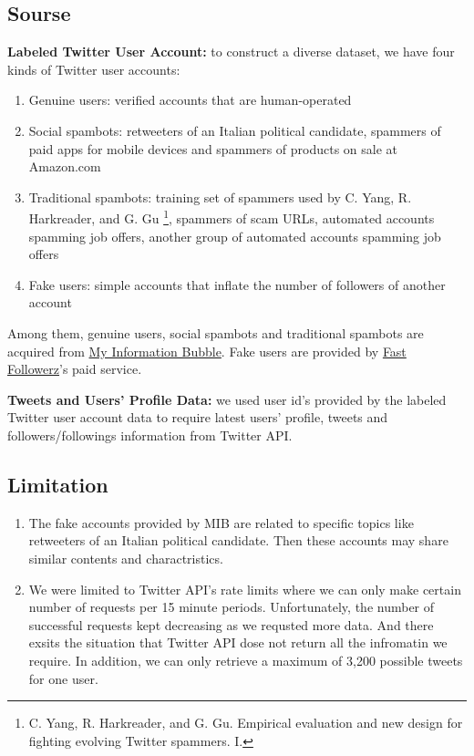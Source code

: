 \documentclass[a4paper, 12pt]{report}
\begin{document}
\subsection*{Sourse}
\textbf{Labeled Twitter User Account:} to construct a diverse dataset, we have four kinds of Twitter user accounts:
\begin{enumerate}
	\item Genuine users: verified accounts that are human-operated
	\item Social spambots: retweeters of an Italian political candidate, spammers of paid apps for mobile devices and spammers of products on sale at Amazon.com
	\item Traditional spambots: training set of spammers used by C. Yang, R. Harkreader, and G. Gu \footnote{C. Yang, R. Harkreader, and G. Gu. Empirical evaluation and new design for fighting evolving Twitter spammers. I.}, spammers of scam URLs, automated accounts spamming job offers, another group of automated accounts spamming job offers	
	\item Fake users: simple accounts that inflate the number of followers of another account
\end{enumerate}
Among them, genuine users, social spambots and traditional spambots are acquired from \href{http://mib.projects.iit.cnr.it/dataset.html}{My Information Bubble}. Fake users are provided by \href{https://www.fastfollowerz.com/closed/}{Fast Followerz}'s paid service. \par

\noindent\textbf{Tweets and Users' Profile Data:} we used user id's provided by the labeled Twitter user account data to require latest users' profile, tweets and followers/followings information from Twitter API.

\subsection*{Limitation}
\begin{enumerate}
	\item The fake accounts provided by MIB are related to specific topics like retweeters of an Italian political candidate. Then these accounts may share similar contents and charactristics.
	\item We were limited to Twitter API's rate limits where we can only make certain number of requests per 15 minute periods. Unfortunately, the number of successful requests kept decreasing as we requsted more data. And there exsits the situation that Twitter API dose not return all the infromatin we require. In addition, we can only retrieve a maximum of 3,200 possible tweets for one user. 
\end{enumerate}
\end{document}
